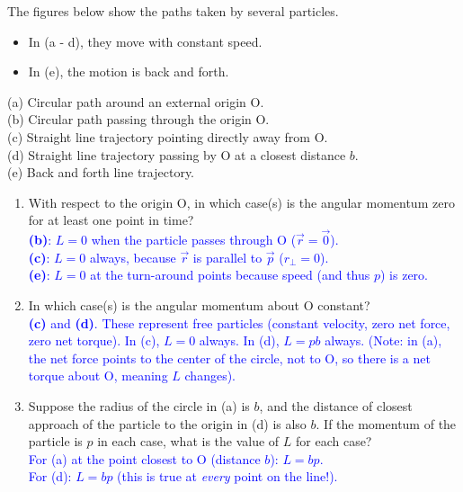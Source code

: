 \documentclass[11pt, letterpaper, openany]{book}
\newenvironment{exercise}[1][Exercise]{%
  \tcolorbox[blanker, breakable, left=1em,
    before skip=1em, after skip=1em,
    borderline west={3pt}{0pt}{PhysNavy},
    colback=PhysCream,
    before upper={\textcolor{PhysNavy}{\sffamily\bfseries #1:}\space}
  ]%
}{%
  \endtcolorbox%
}
\begin{document}
\begin{exercise}[Exercise 3]
The figures below show the paths taken by several particles.
\begin{itemize}
    \item In (a - d), they move with constant speed.
    \item In (e), the motion is back and forth.
\end{itemize}
(a) Circular path around an external origin O. \\
(b) Circular path passing through the origin O. \\
(c) Straight line trajectory pointing directly away from O. \\
(d) Straight line trajectory passing by O at a closest distance $b$. \\
(e) Back and forth line trajectory.

\begin{enumerate}[label=(\roman*)]
    \item With respect to the origin O, in which case(s) is the angular momentum zero for at least one point in time? \\
    \textcolor{blue}{\textbf{(b)}: $L=0$ when the particle passes through O ($\vec{r} = \vec{0}$). \\
    \textbf{(c)}: $L=0$ always, because $\vec{r}$ is parallel to $\vec{p}$ ($r_\perp = 0$). \\
    \textbf{(e)}: $L=0$ at the turn-around points because speed (and thus $p$) is zero.}
    
    \item In which case(s) is the angular momentum about O constant? \\
    \textcolor{blue}{\textbf{(c)} and \textbf{(d)}. These represent free particles (constant velocity, zero net force, zero net torque). In (c), $L=0$ always. In (d), $L=pb$ always. (Note: in (a), the net force points to the center of the circle, not to O, so there is a net torque about O, meaning $L$ changes).}
    
    \item Suppose the radius of the circle in (a) is $b$, and the distance of closest approach of the particle to the origin in (d) is also $b$. If the momentum of the particle is $p$ in each case, what is the value of $L$ for each case? \\
    \textcolor{blue}{
    For (a) at the point closest to O (distance $b$): $L = b p$. \\
    For (d): $L = b p$ (this is true at \textit{every} point on the line!).
    }
\end{enumerate}
\end{exercise}
\end{document}
